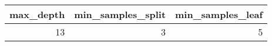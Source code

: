 \begin{tabular}{rrr}
\toprule
max_depth & min_samples_split & min_samples_leaf \\
\midrule
13 & 3 & 5 \\
\bottomrule
\end{tabular}
